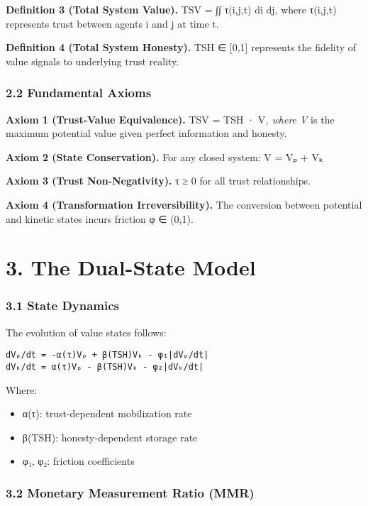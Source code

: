 \documentclass[11pt,oneside]{book}
\begin{document}
{{{{{{\textbf{Definition 3 (Total System Value).} TSV = ∫∫ τ(i,j,t) di dj, where τ(i,j,t) represents trust between agents i and j at time t.

\textbf{Definition 4 (Total System Honesty).} TSH ∈ [0,1] represents the fidelity of value signals to underlying trust reality.

\subsubsection{2.2 Fundamental Axioms}

\textbf{Axiom 1 (Trust-Value Equivalence).} TSV = TSH · V\textit{, where V} is the maximum potential value given perfect information and honesty.

\textbf{Axiom 2 (State Conservation).} For any closed system: V = Vₚ + Vₖ

\textbf{Axiom 3 (Trust Non-Negativity).} τ ≥ 0 for all trust relationships.

\textbf{Axiom 4 (Transformation Irreversibility).} The conversion between potential and kinetic states incurs friction φ ∈ (0,1).

\section{3. The Dual-State Model}

\subsubsection{3.1 State Dynamics}

The evolution of value states follows:

\begin{verbatim}
dVₚ/dt = -α(τ)Vₚ + β(TSH)Vₖ - φ₁|dVₚ/dt|
dVₖ/dt = α(τ)Vₚ - β(TSH)Vₖ - φ₂|dVₖ/dt|
\end{verbatim}

Where:
\begin{itemize}
\item α(τ): trust-dependent mobilization rate
\item β(TSH): honesty-dependent storage rate
\item φ₁, φ₂: friction coefficients
\end{itemize}

\subsubsection{3.2 Monetary Measurement Ratio (MMR)}

}}}}}}
\end{document}
